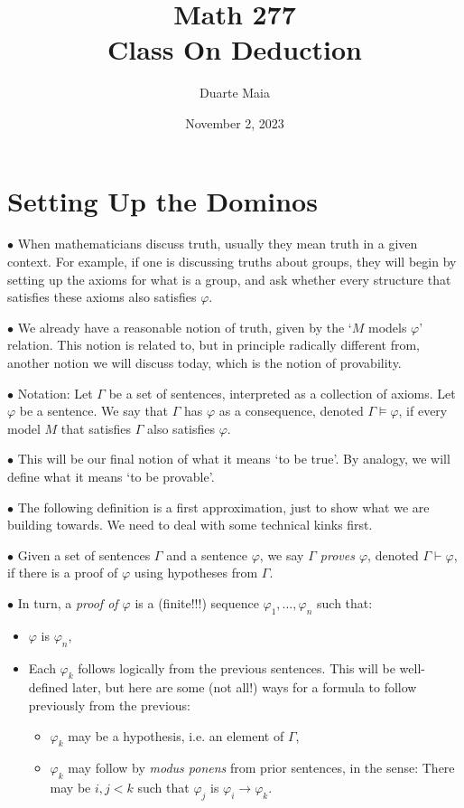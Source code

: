 \documentclass{article}
\title{Math 277\\Class On Deduction}
\author{Duarte Maia}
\date{November 2, 2023}
\newcommand\point[1]{\noindent \hspace{\labelsep} $\bullet$ #1 \smallskip}
\begin{document}
\maketitle

\section{Setting Up the Dominos}

\point{When mathematicians discuss truth, usually they mean truth in a given context. For example, if one is discussing truths about groups, they will begin by setting up the axioms for what is a group, and ask whether every structure that satisfies these axioms also satisfies $\varphi$.}

\point{We already have a reasonable notion of truth, given by the `$M$ models $\varphi$' relation. This notion is related to, but in principle radically different from, another notion we will discuss today, which is the notion of provability.}

\point{Notation: Let $\Gamma$ be a set of sentences, interpreted as a collection of axioms. Let $\varphi$ be a sentence. We say that $\Gamma$ has $\varphi$ as a consequence, denoted $\Gamma \vDash \varphi$, if every model $M$ that satisfies $\Gamma$ also satisfies $\varphi$.}

\point{This will be our final notion of what it means `to be true'. By analogy, we will define what it means `to be provable'.}

\point{The following definition is a first approximation, just to show what we are building towards. We need to deal with some technical kinks first.}

\point{Given a set of sentences $\Gamma$ and a sentence $\varphi$, we say \emph{$\Gamma$ proves $\varphi$}, denoted $\Gamma \vdash \varphi$, if there is a proof of $\varphi$ using hypotheses from $\Gamma$.}

\point{In turn, a \emph{proof of $\varphi$} is a (finite!!!) sequence $\varphi_1, \dots, \varphi_n$ such that:
\begin{itemize}
\item $\varphi$ is $\varphi_n$,
\item Each $\varphi_k$ follows logically from the previous sentences. This will be well-defined later, but here are some (not all!) ways for a formula to follow previously from the previous:
\begin{itemize}
\item $\varphi_k$ may be a hypothesis, i.e. an element of $\Gamma$,
\item $\varphi_k$ may follow by \emph{modus ponens} from prior sentences, in the sense: There may be $i, j < k$ such that $\varphi_j$ is $\varphi_i \rightarrow \varphi_k$.
\end{itemize}
\end{itemize}}
\end{document}
